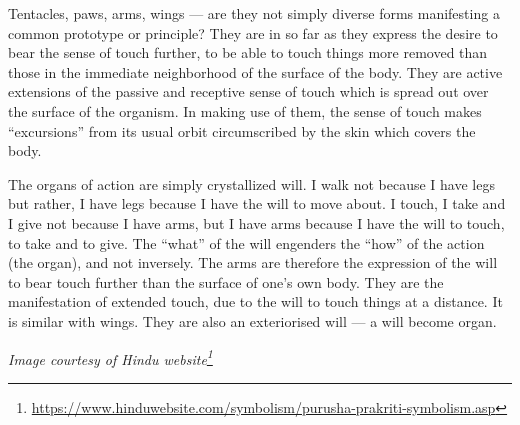 \begin{quotationx}
Tentacles, paws, arms, wings — are they not simply diverse forms manifesting a common prototype or principle? They are in so far as they express the desire to bear the sense of touch further, to be able to touch things more removed than those in the immediate neighborhood of the surface of the body. They are active extensions of the passive and receptive sense of touch which is spread out over the surface of the organism. In making use of them, the sense of touch makes “excursions” from its usual orbit circumscribed by the skin which covers the body.

The organs of action are simply crystallized will. I walk not because I have legs but rather, I have legs because I have the will to move about. I touch, I take and I give not because I have arms, but I have arms because I have the will to touch, to take and to give. The “what” of the will engenders the “how” of the action (the organ), and not inversely. The arms are therefore the expression of the will to bear touch further than the surface of one's own body. They are the manifestation of extended touch, due to the will to touch things at a distance. It is similar with wings. They are also an exteriorised will — a will become organ.

\end{quotationx}

\textit{Image courtesy of Hindu website\footnote{\url{https://www.hinduwebsite.com/symbolism/purusha-prakriti-symbolism.asp}}}

